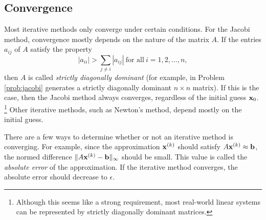\subsection*{Convergence} %

Most iterative methods only converge under certain conditions.
For the Jacobi method, convergence mostly depends on the nature of the matrix $A$.
If the entries $a_{ij}$ of $A$ satisfy the property \[|a_{ii}| > \sum_{j \neq i} |a_{ij}|\ \text{for all}\ i = 1,2,\hdots,n,\] then $A$ is called \emph{strictly diagonally dominant} (for example,  in Problem \ref{prob:jacobi} generates a strictly diagonally dominant $n\times n$ matrix).
If this is the case, then the Jacobi method always converges, regardless of the initial guess $\mathbf{x}_0$.%
\footnote{Although this seems like a strong requirement, most real-world linear systems can be represented by strictly diagonally dominant matrices.
}
Other iterative methods, such as Newton's method, depend mostly on the initial guess.

There are a few ways to determine whether or not an iterative method is converging.
For example, since the approximation $\mathbf{x}^{(k)}$ should satisfy $A\mathbf{x}^{(k)} \approx \mathbf{b}$, the normed difference $\|A\mathbf{x}^{(k)} - \mathbf{b}\|_\infty$ should be small.
This value is called the \emph{absolute error} of the approximation.
If the iterative method converges, the absolute error should decrease to $\epsilon$.

